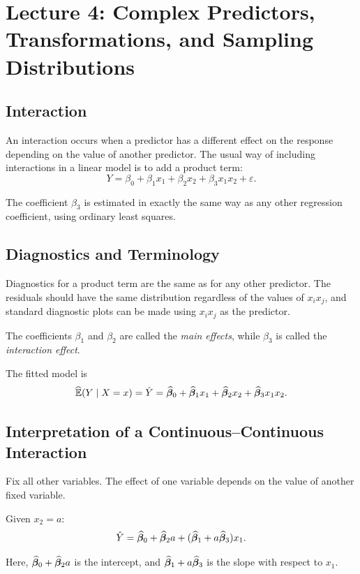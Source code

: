 \section{Lecture 4: Complex Predictors, Transformations, and Sampling Distributions}

\subsection{Interaction}

An interaction occurs when a predictor has a different effect on the response depending on the value of another predictor. The usual way of including interactions in a linear model is to add a product term:
\[
Y = \beta_0 + \beta_1 x_1 + \beta_2 x_2 + \beta_3 x_1 x_2 + \varepsilon.
\]

The coefficient $\beta_3$ is estimated in exactly the same way as any other regression coefficient, using ordinary least squares.

\subsection{Diagnostics and Terminology}

Diagnostics for a product term are the same as for any other predictor. The residuals should have the same distribution regardless of the values of $x_i x_j$, and standard diagnostic plots can be made using $x_i x_j$ as the predictor.

The coefficients $\beta_1$ and $\beta_2$ are called the \emph{main effects}, while $\beta_3$ is called the \emph{interaction effect}.

The fitted model is
\[
\widehat{\mathbb{E}}(Y \mid X = x) = \hat{Y}
= \widehat{\boldsymbol{\beta}}_0 + \widehat{\boldsymbol{\beta}}_1 x_1 + \widehat{\boldsymbol{\beta}}_2 x_2 + \widehat{\boldsymbol{\beta}}_3 x_1 x_2.
\]

\subsection{Interpretation of a Continuous--Continuous Interaction}

Fix all other variables. The effect of one variable depends on the value of another fixed variable.

Given $x_2 = a$:
\[
\hat{Y}
= \widehat{\boldsymbol{\beta}}_0 + \widehat{\boldsymbol{\beta}}_2 a + (\widehat{\boldsymbol{\beta}}_1 + a \widehat{\boldsymbol{\beta}}_3) x_1.
\]

Here, $\widehat{\boldsymbol{\beta}}_0 + \widehat{\boldsymbol{\beta}}_2 a$ is the intercept, and $\widehat{\boldsymbol{\beta}}_1 + a \widehat{\boldsymbol{\beta}}_3$ is the slope with respect to $x_1$.

